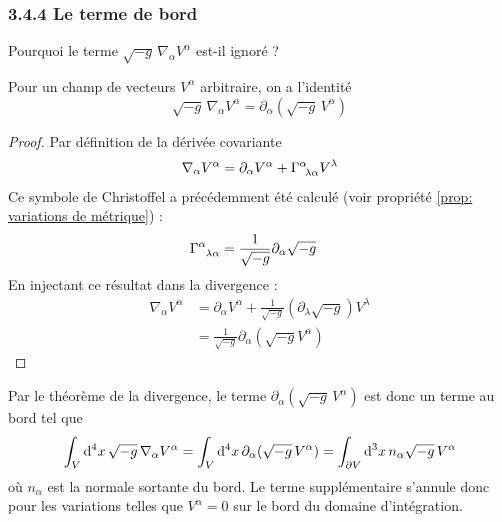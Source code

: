 \subsubsection{3.4.4 Le terme de bord}
Pourquoi le terme $\sqrt{-g}\,\nabla_{\alpha} V^{\alpha}$ est-il ignoré ? 
\begin{theoremframe}
    \begin{lemme}
        \label{lem:nabla to mu vecteur}
        Pour un champ de vecteurs $V^\alpha$ arbitraire, on a l'identité
        \begin{equation}
            \sqrt{-g}\,\nabla_{\alpha} V^{\alpha} = \partial_{\alpha}( \sqrt{-g}\, V^{\alpha})
        \end{equation}
    \end{lemme}
\end{theoremframe}
\begin{proof}
    Par définition de la dérivée covariante
    \begin{align}
       \nabla_{\alpha}V^{\alpha} = \partial_{\alpha}V^{\alpha} + \Gamma\indices{^{\alpha}_{\!\lambda \alpha}}V^{\lambda}
    \end{align}
    Ce symbole de Christoffel a précédemment été calculé (voir propriété \ref{prop: variations de métrique}) :
    \begin{align}
        \Gamma\indices{^{\alpha}_{\lambda \alpha}} &= \frac{1}{\sqrt{-g}}\partial_{\alpha}\sqrt{-g}
    \end{align}
    En injectant ce résultat dans la divergence :
    \begin{align}
        \nabla_{\alpha}V^{\alpha} &= \partial_{\alpha}V^{\alpha} + \frac{1}{\sqrt{-g}}(\partial_{\lambda}\sqrt{-g})V^{\lambda}\\
        &= \frac{1}{\sqrt{-g}}\partial_{\alpha}(\sqrt{-g}V^{\alpha})
    \end{align}
\end{proof}
Par le théorème de la divergence, le terme $\partial_{\alpha}( \sqrt{-g} \,V^{\alpha})$ est donc un terme au bord tel que 
\begin{equation}
    \int_{V} \mathrm{d}^4 x \, \sqrt{-g} \, \nabla_{\alpha}V^{\alpha} = \int_{V} \mathrm{d}^4 x \, \partial_{\alpha}( \sqrt{-g}\,V^{\alpha}) = \int_{\partial V} \mathrm{d}^3 x \, n_{\alpha}\sqrt{-g}\,V^{\alpha}
\end{equation}
où $n_{\alpha}$ est la normale sortante du bord. Le terme supplémentaire s'annule donc pour les variations telles que $V^\alpha =0$ sur le bord du domaine d'intégration.
